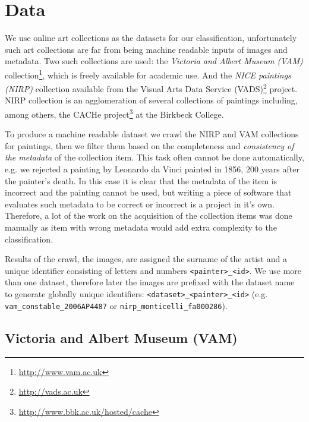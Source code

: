 \documentclass[11pt,a4paper,twoside,openright]{report}
\begin{document}

\chapter{Data}
\label{chap:data}

We use online art collections as the datasets for our classification,
unfortunately such art collections are far from being machine readable inputs
of images and metadata.  Two such collections are used: the \emph{Victoria and
Albert Museum (VAM)} collection\footnote{\href{http://www.vam.ac.uk/}
{http://www.vam.ac.uk}}, which is freely available for academic use.  And the
\emph{NICE paintings (NIRP)} collection available from the Visual Arts Data
Service (VADS)\footnote{\href{http://vads.ac.uk/}{http://vads.ac.uk}} project.
NIRP collection is an agglomeration of several collections of paintings
including, among others, the CACHe project\footnote{
\href{http://www.bbk.ac.uk/hosted/cache/}{http://www.bbk.ac.uk/hosted/cache}}
at the Birkbeck College.

To produce a machine readable dataset we crawl the NIRP and VAM collections for
paintings, then we filter them based on the completeness and \emph{consistency
of the metadata} of the collection item.  This task often cannot be done
automatically, e.g. we rejected a painting by Leonardo da Vinci painted in
1856, 200 years after the painter's death.  In this case it is clear that the
metadata of the item is incorrect and the painting cannot be used, but writing
a piece of software that evaluates such metadata to be correct or incorrect is
a project in it's own.  Therefore, a lot of the work on the acquisition of the
collection items was done manually as item with wrong metadata would add extra
complexity to the classification.

Results of the crawl, the images, are assigned the surname of the artist and a
unique identifier consisting of letters and numbers \texttt{<painter>\_<id>}.
We use more than one dataset, therefore later the images are prefixed with the
dataset name to generate globally unique identifiers:
\texttt{<dataset>\_<painter>\_<id>} (e.g. \texttt{vam\_constable\_2006AP4487}
or \texttt{nirp\_monticelli\_fa000286}).

\section{Victoria and Albert Museum (VAM)}
\end{document}
